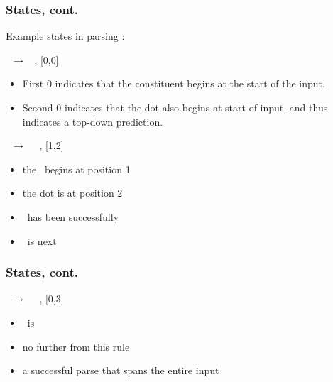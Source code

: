 \begin{frame}[fragile]
  \frametitle{States, cont.}

Example states in parsing :
 
\begin{enum}
  
  \item \Se\ $\rightarrow$\; \bigdot\ \VP, [0,0]

    \begin{itemize}
    \item First 0 indicates that the constituent begins at the start of the
      input.
    \item Second 0 indicates that the dot also begins at start of input, and
      thus indicates a top-down prediction.
    \end{itemize} 

  \item \NP\ $\rightarrow$ \Det\ \bigdot\ \Nom, [1,2]

    \begin{itemize}
    \item the \NP\ begins at position 1
    \item the dot is at position 2
    \item \Det\ has been successfully 
    \item \Nom\ is  next
    \end{itemize}
  \end{enum}
\end{frame}




\begin{frame}[fragile]
  \frametitle{States, cont.}

  \begin{enum}

    \item \VP\ $\rightarrow$ \V\ \NP\ \bigdot, [0,3]

      \begin{itemize}
      \item \VP\ is 
      \item no further  from this rule
      \item a successful parse that spans the entire input
      \end{itemize}
    \end{enum}

\end{frame}



